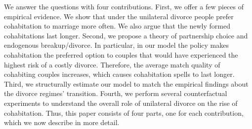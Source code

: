 \documentclass[12pt]{article}
\numberwithin{table}{section}
\begin{document}
We answer the questions with four contributions. First, we offer a few pieces of empirical evidence. We show that under the unilateral divorce people prefer cohabitation to marriage more often. We also argue that the newly formed cohabitations last longer. Second, we propose a theory of partnership choice and endogenous breakup/divorce. In particular, in our model the policy makes cohabitation the preferred option to couples that would have experienced the highest risk of a costly divorce. Therefore, the average match quality of cohabiting couples increases, which causes cohabitation spells to last longer. %
Third, we structurally estimate our model to match the empirical findings about the divorce regimes' transition. Fourth, we perform several counterfactual experiments to understand the overall role of unilateral divorce on the rise of cohabitation. Thus, this paper consists of four parts, one for each contribution, which we now describe in more detail.

\end{document}
